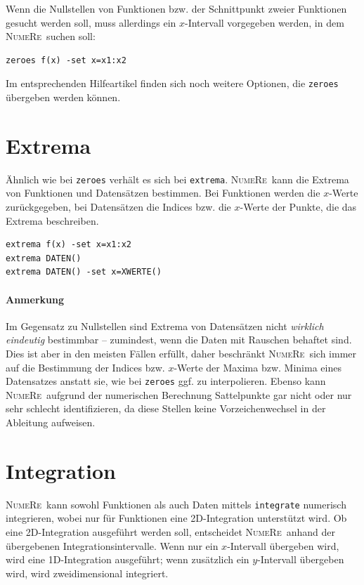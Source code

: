 \documentclass[DIV=14,headsepline,footsepline]{scrbook}
\newcommand{\NR}{\textsc{Nu\-me\-Re}}
\begin{document}
				Wenn die Nullstellen von Funktionen bzw. der Schnittpunkt zweier Funktionen gesucht werden soll, muss allerdings ein $x$-Intervall vorgegeben werden, in dem \NR\ suchen soll:
				\begin{lstlisting}
zeroes f(x) -set x=x1:x2
				\end{lstlisting}
				
				Im entsprechenden Hilfeartikel finden sich noch weitere Optionen, die \verb+zeroes+ übergeben werden können.
				
			\section{Extrema}
				Ähnlich wie bei \verb+zeroes+ verhält es sich bei \verb+extrema+. \NR\ kann die Extrema von Funktionen und Datensätzen bestimmen. Bei Funktionen werden die $x$-Werte zurückgegeben, bei Datensätzen die Indices bzw. die $x$-Werte der Punkte, die das Extrema beschreiben.
				\begin{lstlisting}
extrema f(x) -set x=x1:x2
extrema DATEN()
extrema DATEN() -set x=XWERTE()
				\end{lstlisting}
				\paragraph{Anmerkung}Im Gegensatz zu Nullstellen sind Extrema von Datensätzen nicht \emph{wirklich eindeutig} bestimmbar -- zumindest, wenn die Daten mit Rauschen behaftet sind. Dies ist aber in den meisten Fällen erfüllt, daher beschränkt \NR\ sich immer auf die Bestimmung der Indices bzw. $x$-Werte der Maxima bzw. Minima eines Datensatzes anstatt sie, wie bei \verb+zeroes+ ggf. zu interpolieren. Ebenso kann \NR\ aufgrund der numerischen Berechnung Sattelpunkte gar nicht oder nur sehr schlecht identifizieren, da diese Stellen keine Vorzeichenwechsel in der Ableitung aufweisen.
				
			\section{Integration}
				\NR\ kann sowohl Funktionen als auch Daten mittels \verb+integrate+ numerisch integrieren, wobei nur für Funktionen eine 2D-Integration unterstützt wird. Ob eine 2D-Integration ausgeführt werden soll, entscheidet \NR\ anhand der übergebenen Integrationsintervalle. Wenn nur ein $x$-Intervall übergeben wird, wird eine 1D-Integration ausgeführt; wenn zusätzlich ein $y$-Intervall übergeben wird, wird zweidimensional integriert.
				
\end{document}
